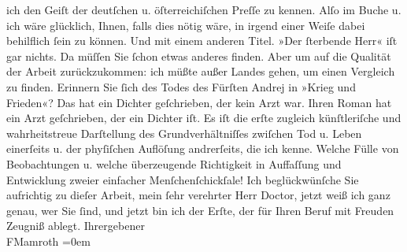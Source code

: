 \begin{ledgroupsized}[t]{13cm}
               ich den Geiſt der deutſchen u. öſterreichiſchen Preſſe zu kennen. Alſo im Buche
               u. ich wäre glücklich, Ihnen, falls dies nötig wäre, in irgend einer Weiſe dabei
               behilflich ſein zu können. Und mit einem anderen Titel. »Der ſterbende Herr« iſt gar nichts. Da müſſen Sie ſchon etwas
               anderes finden. Aber um auf die Qualität der Arbeit zurückzukommen: ich müßte außer
               Landes gehen, um einen Vergleich zu finden. Erinnern Sie ſich des Todes des Fürſten
               Andrej in »Krieg und Frieden«? Das hat ein Dichter geſchrieben, der kein
               Arzt war. Ihren Roman hat ein Arzt geſchrieben, der ein Dichter iſt. Es iſt die erſte
               zugleich künſtleriſche und wahrheitstreue Darſtellung des Grundverhältniſſes zwiſchen
               Tod u. Leben einerſeits u. der phyſiſchen Auflöſung andrerſeits, die ich kenne.
               Welche Fülle von Beobachtungen u. welche überzeugende Richtigkeit in Auffaſſung und
               Entwicklung zweier einfacher Menſchenſchickſale! Ich beglückwünſche Sie aufrichtig zu
               dieſer Arbeit, mein ſehr verehrter Herr Doctor, jetzt weiß ich ganz genau, wer Sie
               ſind, und jetzt bin ich der Erſte, der für Ihren Beruf mit Freuden Zeugniß
               ablegt.\pend
           \pstart
           Ihr\hspace*{1.5em}ergebener{\\[\baselineskip]}\spacefill\mbox{FMamroth}\pend
           \leftskip=0em{}
         
         \endnumbering{}\end{ledgroupsized}  \newcommand{\dateiname}{L00186}\newcommand{\titel}{Fedor Mamroth an Arthur Schnitzler, 5. 3. 1893}\newcommand{\editorInnen}{Martin Anton Müller und Gerd-Hermann Susen}
      